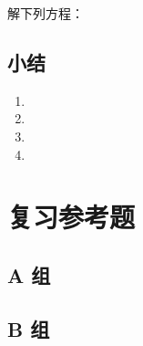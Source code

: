 \begin{Exercise}
  解下列方程：
  \begin{question}
    \item 
    \item 
    \item 
    \item 
    \item 
    \item 
    \item 
    \item 
    \item 
    \item 
    \item 
    \item 
    \item 
    \item 
    \item 
    \item 
    \item 
    \item 
    \item 
    \item 
  \end{question}
\end{Exercise}

\section*{小结}
\begin{enumerate}[C、,itemindent=4.5em]
  \item 
  \item 
  \item 
  \item 
\end{enumerate}
\chapter*{复习参考题}
\section*{A 组}
\begin{question}
  \item 
  \item 
  \item 
  \item 
  \item 
  \item 
  \item 
  \item 
  \item 
  \item 
  \item 
  \item 
\end{question}
\section*{B 组}
\begin{question}[resume]
  \item 
  \item 
  \item 
  \item 
  \item 
  \item 
\end{question}